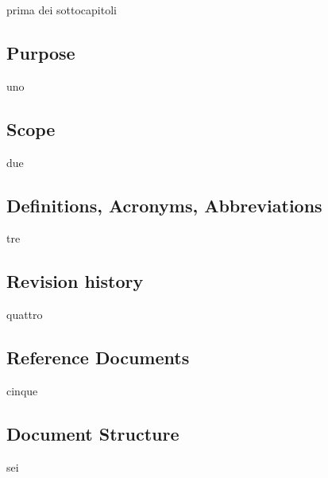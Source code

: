 prima dei sottocapitoli
\subsection{Purpose}
uno
\subsection{Scope}
due
\subsection{Definitions, Acronyms, Abbreviations}
tre
\subsection{Revision history}
quattro
\subsection{Reference Documents}
cinque
\subsection{Document Structure}
sei
